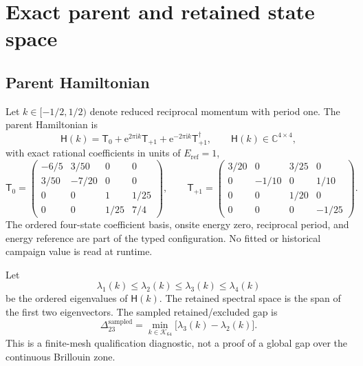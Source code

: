 \documentclass[11pt]{article}
\newcommand{\CC}{\mathbb{C}}
\newcommand{\ee}{\mathrm{e}}
\newcommand{\ii}{\mathrm{i}}
\newcommand{\mat}[1]{\mathsf{#1}}
\newcommand{\eref}{E_{\mathrm{ref}}}
\begin{document}
\section{Exact parent and retained state space}

\subsection{Parent Hamiltonian}

Let $k\in[-1/2,1/2)$ denote reduced reciprocal momentum with period one.  The parent
Hamiltonian is
\begin{equation}
 \mat{H}(k)=\mat{T}_0+\ee^{2\pi\ii k}\mat{T}_{+1}
 +\ee^{-2\pi\ii k}\mat{T}_{+1}^{\dagger},
 \qquad \mat{H}(k)\in\CC^{4\times4},
 \label{eq:parent}
\end{equation}
with exact rational coefficients in units of $\eref=1$,
\begin{equation}
\mat{T}_0=\begin{pmatrix}
-6/5&3/50&0&0\\
3/50&-7/20&0&0\\
0&0&1&1/25\\
0&0&1/25&7/4
\end{pmatrix},\qquad
\mat{T}_{+1}=\begin{pmatrix}
3/20&0&3/25&0\\
0&-1/10&0&1/10\\
0&0&1/20&0\\
0&0&0&-1/25
\end{pmatrix}.
\label{eq:parent-blocks}
\end{equation}
The ordered four-state coefficient basis, onsite energy zero, reciprocal period, and
energy reference are part of the typed configuration.  No fitted or historical
campaign value is read at runtime.

Let
\begin{equation}
 \lambda_1(k)\leq\lambda_2(k)\leq\lambda_3(k)\leq\lambda_4(k)
\end{equation}
be the ordered eigenvalues of $\mat{H}(k)$.  The retained spectral space is the span of
the first two eigenvectors.  The sampled retained/excluded gap is
\begin{equation}
 \Delta_{23}^{\mathrm{sampled}}
 =\min_{k\in\mathcal K_{64}}\bigl[\lambda_3(k)-\lambda_2(k)\bigr].
 \label{eq:sampled-gap}
\end{equation}
This is a finite-mesh qualification diagnostic, not a proof of a global gap over the
continuous Brillouin zone.
\end{document}
